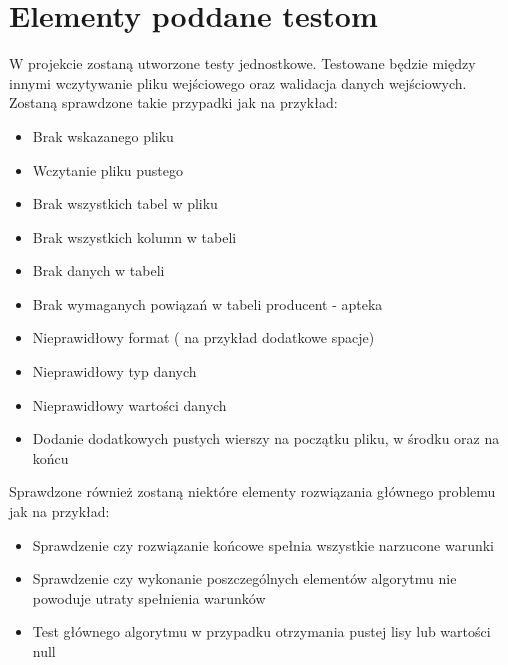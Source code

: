 \documentclass[12pt]{article}
\begin{document}
\section{Elementy poddane testom}
\qquad W projekcie zostaną utworzone testy jednostkowe. Testowane będzie między innymi wczytywanie pliku wejściowego oraz walidacja danych wejściowych. Zostaną sprawdzone takie przypadki jak na przykład:
  
\begin{itemize}
  \item Brak wskazanego pliku 
  \item Wczytanie pliku pustego
  \item Brak wszystkich tabel w pliku
  \item Brak wszystkich kolumn w tabeli
  \item Brak danych w tabeli
  \item Brak wymaganych powiązań w tabeli producent - apteka
  \item Nieprawidłowy format ( na przykład dodatkowe spacje)
  \item Nieprawidłowy typ danych
  \item Nieprawidłowy wartości danych
  \item Dodanie dodatkowych pustych wierszy na początku pliku, w środku oraz na końcu
  \end{itemize}

Sprawdzone również zostaną niektóre elementy rozwiązania głównego problemu jak na przykład:
\begin{itemize}
  \item Sprawdzenie czy rozwiązanie końcowe spełnia wszystkie narzucone warunki 
  \item Sprawdzenie czy wykonanie poszczególnych elementów algorytmu nie powoduje utraty spełnienia warunków
  \item Test głównego algorytmu w przypadku otrzymania pustej lisy lub wartości null
  

  
\end{itemize}
\end{document}
